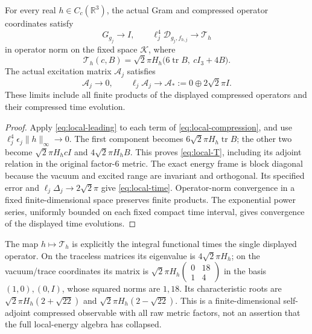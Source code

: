 \begin{theorem}\label{thm:local-common}
For every real $h\in C_c(\mathbb R^3)$, the actual Gram and
compressed operator coordinates satisfy
\[
 G_{g_j}\to I,\qquad
 \ell_j^4\mathcal D_{g_j,f_{h,j}}\to\mathcal T_h
\]
in operator norm on the fixed space $\mathcal K$, where
\begin{equation}\label{eq:local-T}
 \mathcal T_h(c,B)=
 \sqrt2\pi H_h\bigl(6\operatorname{tr}B,\ cI_3+4B\bigr).
\end{equation}
The actual excitation matrix $\mathcal A_j$ satisfies
\begin{equation}\label{eq:local-time}
 \mathcal A_j\to0,\qquad
 \ell_j\mathcal A_j\to
       \mathcal A_*:=0\oplus2\sqrt2\pi I.
\end{equation}
These limits include all finite products of the displayed compressed
operators and their compressed time evolution.
\end{theorem}
\begin{proof}
Apply \eqref{eq:local-leading} to each term of
\eqref{eq:local-compression}, and use
$\ell_j^4\epsilon_j\|h\|_\infty\to0$.
The first component becomes $6\sqrt2\pi H_h\operatorname{tr}B$;
the other two become $\sqrt2\pi H_hcI$ and
$4\sqrt2\pi H_hB$. This proves \eqref{eq:local-T}, including its
adjoint relation in the original factor-$6$ metric.
The exact energy frame is block diagonal because the vacuum and
excited range are invariant and orthogonal. Its specified error
and $\ell_j\Delta_j\to2\sqrt2\pi$ give \eqref{eq:local-time}.
Operator-norm convergence in a fixed finite-dimensional space
preserves finite products. The exponential power series, uniformly
bounded on each fixed compact time interval, gives convergence of
the displayed time evolutions.
\end{proof}

The map $h\mapsto\mathcal T_h$ is explicitly the integral functional
times the single displayed operator. On the traceless matrices its
eigenvalue is $4\sqrt2\pi H_h$; on the vacuum/trace coordinates its
matrix is $\sqrt2\pi H_h\left(\begin{smallmatrix}0&18\\1&4\end{smallmatrix}\right)$
in the basis $(1,0),(0,I)$, whose squared norms are $1,18$.
Its characteristic roots are
$\sqrt2\pi H_h(2+\sqrt{22})$ and
$\sqrt2\pi H_h(2-\sqrt{22})$. This is a finite-dimensional
self-adjoint compressed observable with all raw metric factors,
not an assertion that the full local-energy algebra has collapsed.

